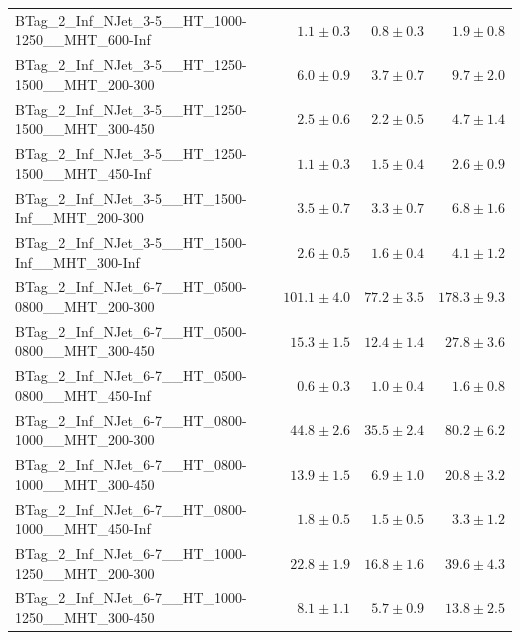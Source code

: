 \documentclass{beamer}
\begin{document}
\begin{frame}
\begin{tabular}{lrrr}
 BTag\_2\_Inf\_NJet\_3-5\_\_HT\_1000-1250\_\_MHT\_600-Inf &               $1.1\pm0.3$&               $0.8\pm0.3$&                   $1.9\pm0.8$ \\ 
 BTag\_2\_Inf\_NJet\_3-5\_\_HT\_1250-1500\_\_MHT\_200-300 &               $6.0\pm0.9$&               $3.7\pm0.7$&                   $9.7\pm2.0$ \\ 
 BTag\_2\_Inf\_NJet\_3-5\_\_HT\_1250-1500\_\_MHT\_300-450 &               $2.5\pm0.6$&               $2.2\pm0.5$&                   $4.7\pm1.4$ \\ 
 BTag\_2\_Inf\_NJet\_3-5\_\_HT\_1250-1500\_\_MHT\_450-Inf &               $1.1\pm0.3$&               $1.5\pm0.4$&                   $2.6\pm0.9$ \\ 
  BTag\_2\_Inf\_NJet\_3-5\_\_HT\_1500-Inf\_\_MHT\_200-300 &               $3.5\pm0.7$&               $3.3\pm0.7$&                   $6.8\pm1.6$ \\ 
  BTag\_2\_Inf\_NJet\_3-5\_\_HT\_1500-Inf\_\_MHT\_300-Inf &               $2.6\pm0.5$&               $1.6\pm0.4$&                   $4.1\pm1.2$ \\ 
 BTag\_2\_Inf\_NJet\_6-7\_\_HT\_0500-0800\_\_MHT\_200-300 &             $101.1\pm4.0$&              $77.2\pm3.5$&                 $178.3\pm9.3$ \\ 
 BTag\_2\_Inf\_NJet\_6-7\_\_HT\_0500-0800\_\_MHT\_300-450 &              $15.3\pm1.5$&              $12.4\pm1.4$&                  $27.8\pm3.6$ \\ 
 BTag\_2\_Inf\_NJet\_6-7\_\_HT\_0500-0800\_\_MHT\_450-Inf &               $0.6\pm0.3$&               $1.0\pm0.4$&                   $1.6\pm0.8$ \\ 
 BTag\_2\_Inf\_NJet\_6-7\_\_HT\_0800-1000\_\_MHT\_200-300 &              $44.8\pm2.6$&              $35.5\pm2.4$&                  $80.2\pm6.2$ \\ 
 BTag\_2\_Inf\_NJet\_6-7\_\_HT\_0800-1000\_\_MHT\_300-450 &              $13.9\pm1.5$&               $6.9\pm1.0$&                  $20.8\pm3.2$ \\ 
 BTag\_2\_Inf\_NJet\_6-7\_\_HT\_0800-1000\_\_MHT\_450-Inf &               $1.8\pm0.5$&               $1.5\pm0.5$&                   $3.3\pm1.2$ \\ 
 BTag\_2\_Inf\_NJet\_6-7\_\_HT\_1000-1250\_\_MHT\_200-300 &              $22.8\pm1.9$&              $16.8\pm1.6$&                  $39.6\pm4.3$ \\ 
 BTag\_2\_Inf\_NJet\_6-7\_\_HT\_1000-1250\_\_MHT\_300-450 &               $8.1\pm1.1$&               $5.7\pm0.9$&                  $13.8\pm2.5$ \\ 

\end{tabular}
\end{frame}
\end{document}

